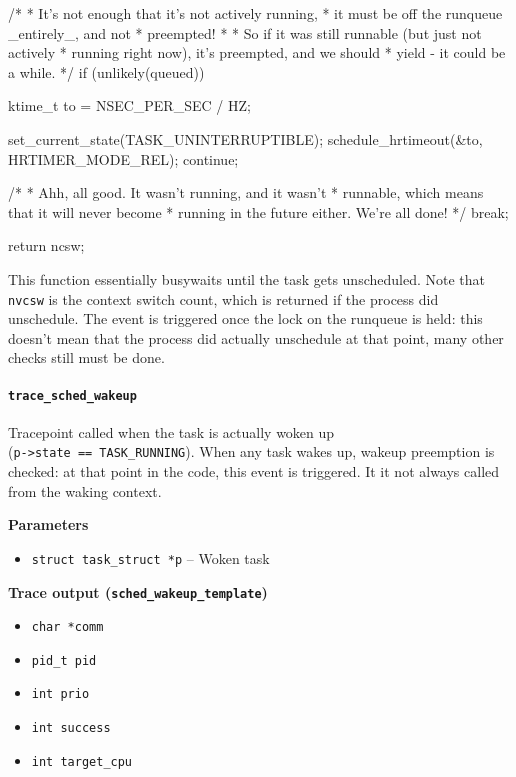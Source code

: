 \begin{code}
{{		/*
		 * It's not enough that it's not actively running,
		 * it must be off the runqueue _entirely_, and not
		 * preempted!
		 *
		 * So if it was still runnable (but just not actively
		 * running right now), it's preempted, and we should
		 * yield - it could be a while.
		 */
		if (unlikely(queued)) {
			ktime_t to = NSEC_PER_SEC / HZ;

			set_current_state(TASK_UNINTERRUPTIBLE);
			schedule_hrtimeout(&to, HRTIMER_MODE_REL);
			continue;
		}

		/*
		 * Ahh, all good. It wasn't running, and it wasn't
		 * runnable, which means that it will never become
		 * running in the future either. We're all done!
		 */
		break;
	}

	return ncsw;
}
\end{code}
This function essentially busywaits until the task gets unscheduled. Note that \verb|nvcsw| is the context switch count, which is returned if the process did unschedule. The event is triggered once the lock on the runqueue is held: this doesn't mean that the process did actually unschedule at that point, many other checks still must be done.

\paragraph{\texttt{trace\_sched\_wakeup}}
Tracepoint called when the task is actually woken up\\ (\verb|p->state == TASK_RUNNING|). When any task wakes up, wakeup preemption is checked: at that point in the code, this event is triggered. It it not always called from the waking context.

\textbf{Parameters}
\begin{itemize}
    \item \verb|struct task_struct *p| -- Woken task
\end{itemize}

\textbf{Trace output (\texttt{sched\_wakeup\_template})}
\begin{itemize}
    \item \verb|char *comm|
    \item \verb|pid_t pid|
    \item \verb|int prio|
    \item \verb|int success|
    \item \verb|int target_cpu|
\end{itemize}

